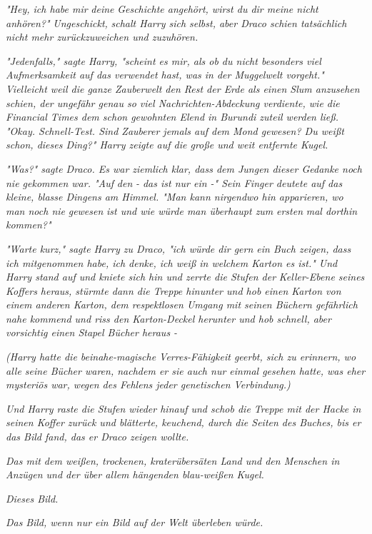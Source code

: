 {\emph{"Hey, ich habe mir} \emph{\emph{deine}} \emph{Geschichte angehört, wirst du dir meine nicht anhören?"} \emph{\emph{Ungeschickt,}} \emph{schalt Harry sich selbst, aber Draco schien tatsächlich nicht mehr zurückzuweichen und zuzuhören.}

\emph{"Jedenfalls," sagte Harry, "scheint es mir, als ob du nicht besonders viel Aufmerksamkeit auf das verwendet hast, was in der Muggelwelt vorgeht." Vielleicht weil die ganze Zauberwelt den Rest der Erde als einen Slum anzusehen schien, der ungefähr genau so viel Nachrichten-Abdeckung verdiente, wie die \emph{Financial Times dem schon gewohnten Elend in Burundi zuteil werden ließ. "Okay. Schnell-Test. Sind Zauberer jemals auf dem Mond gewesen? Du weißt schon, dieses Ding?" Harry zeigte auf die große und weit entfernte Kugel.}}

\emph{"\emph{Was?}" sagte Draco. Es war ziemlich klar, dass dem Jungen dieser Gedanke noch nie gekommen war. "Auf} \emph{\emph{den}} \emph{- das ist nur ein -" Sein Finger deutete auf das kleine, blasse Dingens am Himmel. "Man kann nirgendwo hin apparieren, wo man noch nie} \emph{\emph{gewesen}} \emph{ist und wie würde man überhaupt zum} \emph{\emph{ersten}} \emph{mal dorthin kommen?"}

\emph{"Warte kurz," sagte Harry zu Draco, "ich würde dir gern ein Buch zeigen, dass ich mitgenommen habe, ich denke, ich weiß in welchem Karton es ist." Und Harry stand auf und kniete sich hin und zerrte die Stufen der} \emph{Keller-Ebene seines Koffers heraus, stürmte dann die Treppe hinunter und hob einen Karton von einem anderen Karton, dem respektlosen Umgang mit seinen Büchern gefährlich nahe kommend und riss den Karton-Deckel herunter und hob schnell, aber vorsichtig einen Stapel Bücher heraus -}

\emph{(Harry hatte die beinahe-magische Verres-Fähigkeit geerbt, sich zu erinnern, wo alle seine Bücher waren, nachdem er sie auch nur einmal gesehen hatte, was eher mysteriös war, wegen des Fehlens jeder genetischen Verbindung.)}

\emph{Und Harry raste die Stufen wieder hinauf und schob die Treppe mit der Hacke in seinen Koffer zurück und blätterte, keuchend, durch die Seiten des Buches, bis er das Bild fand, das er Draco zeigen wollte.}

\emph{Das mit dem weißen, trockenen, kraterübersäten Land und den Menschen in Anzügen und der über allem hängenden blau-weißen Kugel.}

\emph{Dieses Bild.}

\emph{\emph{Das}} \emph{Bild, wenn nur ein Bild auf der Welt überleben würde.}

}
